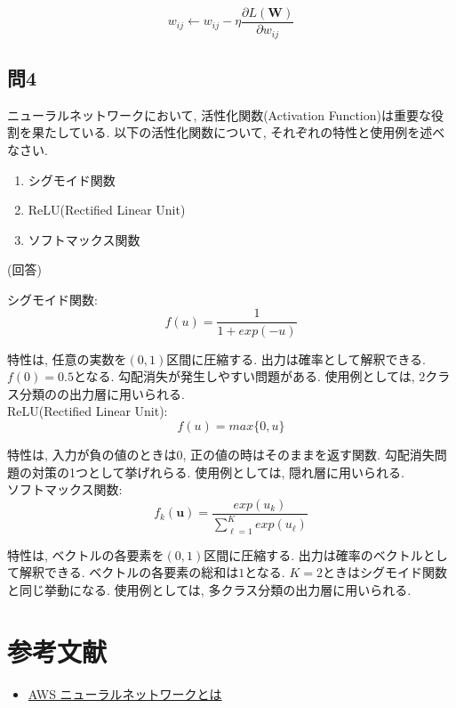 \documentclass[dvipdfmx, 10pt]{jsarticle}
\begin{document}
\[
w_{ij} \leftarrow w_{ij} - \eta \frac{\partial L(\mathbf{W})}{\partial w_{ij}}
\]

\subsection*{問4}
ニューラルネットワークにおいて, 活性化関数(Activation Function)は重要な役割を果たしている. 以下の活性化関数について, それぞれの特性と使用例を述べなさい.   
\begin{enumerate}
    \item シグモイド関数
    \item ReLU(Rectified Linear Unit)
    \item ソフトマックス関数
\end{enumerate}

(回答)

シグモイド関数: 
\[
f(u) = \frac{1}{1 + exp(-u)}
\]

特性は, 任意の実数を$(0,1)$区間に圧縮する. 出力は確率として解釈できる. $f(0) = 0.5$となる. 勾配消失が発生しやすい問題がある. 
使用例としては, 2クラス分類のの出力層に用いられる. \\

ReLU(Rectified Linear Unit): 
\[
f(u) = max \{0, u\}
\]

特性は, 入力が負の値のときは$0$, 正の値の時はそのままを返す関数. 勾配消失問題の対策の1つとして挙げれらる. 
使用例としては, 隠れ層に用いられる. \\

ソフトマックス関数: 
\[
f_k(\mathbf{u}) = \frac{exp(u_k)}{\sum_{\ell=1}^{K} exp(u_{\ell})}
\]

特性は, ベクトルの各要素を$(0,1)$区間に圧縮する. 出力は確率のベクトルとして解釈できる. 
ベクトルの各要素の総和は$1$となる. 
$K=2$ときはシグモイド関数と同じ挙動になる. 
使用例としては, 多クラス分類の出力層に用いられる. 

\section*{参考文献}
\begin{itemize}
    \item \href{https://aws.amazon.com/jp/what-is/neural-network/}{AWS ニューラルネットワークとは}
\end{itemize}
\end{document}
